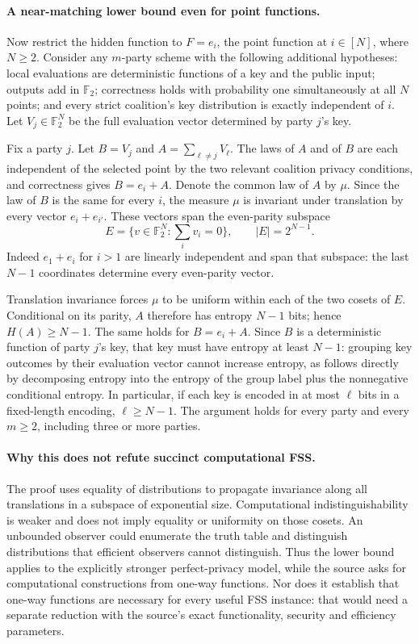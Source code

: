\documentclass[11pt]{article}
\begin{document}
\paragraph{A near-matching lower bound even for point functions.}
Now restrict the hidden function to $F=e_i$, the point function at $i\in[N]$, where $N\ge2$. Consider any $m$-party scheme with the following additional hypotheses: local evaluations are deterministic functions of a key and the public input; outputs add in $\mathbb F_2$; correctness holds with probability one simultaneously at all $N$ points; and every strict coalition's key distribution is exactly independent of $i$. Let $V_j\in\mathbb F_2^N$ be the full evaluation vector determined by party $j$'s key.

Fix a party $j$. Let $B=V_j$ and $A=\sum_{\ell\ne j}V_\ell$. The laws of $A$ and of $B$ are each independent of the selected point by the two relevant coalition privacy conditions, and correctness gives $B=e_i+A$. Denote the common law of $A$ by $\mu$. Since the law of $B$ is the same for every $i$, the measure $\mu$ is invariant under translation by every vector $e_i+e_{i'}$. These vectors span the even-parity subspace
\[
 E=\{v\in\mathbb F_2^N:\sum_i v_i=0\},\qquad |E|=2^{N-1}.
\]
Indeed $e_1+e_i$ for $i>1$ are linearly independent and span that subspace: the last $N-1$ coordinates determine every even-parity vector.

Translation invariance forces $\mu$ to be uniform within each of the two cosets of $E$. Conditional on its parity, $A$ therefore has entropy $N-1$ bits; hence $H(A)\ge N-1$. The same holds for $B=e_i+A$. Since $B$ is a deterministic function of party $j$'s key, that key must have entropy at least $N-1$: grouping key outcomes by their evaluation vector cannot increase entropy, as follows directly by decomposing entropy into the entropy of the group label plus the nonnegative conditional entropy. In particular, if each key is encoded in at most $\ell$ bits in a fixed-length encoding, $\ell\ge N-1$. The argument holds for every party and every $m\ge2$, including three or more parties.

\paragraph{Why this does not refute succinct computational FSS.}
The proof uses equality of distributions to propagate invariance along all translations in a subspace of exponential size. Computational indistinguishability is weaker and does not imply equality or uniformity on those cosets. An unbounded observer could enumerate the truth table and distinguish distributions that efficient observers cannot distinguish. Thus the lower bound applies to the explicitly stronger perfect-privacy model, while the source asks for computational constructions from one-way functions. Nor does it establish that one-way functions are necessary for every useful FSS instance: that would need a separate reduction with the source's exact functionality, security and efficiency parameters.
\end{document}
